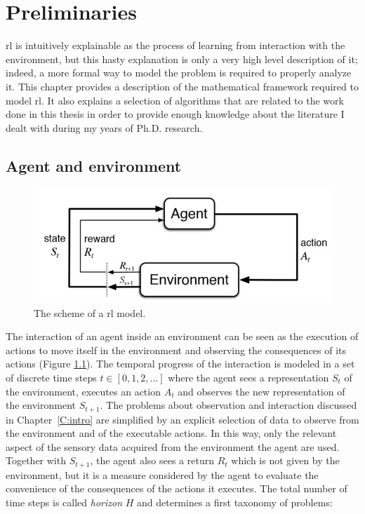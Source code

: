 \chapter{Preliminaries}
\gls{rl} is intuitively explainable as the process of learning from interaction with the environment, but this hasty explanation is only a very high level description of it; indeed, a more formal way to model the problem is required to properly analyze it. This chapter provides a description of the mathematical framework required to model \gls{rl}. It also explains a selection of algorithms that are related to the work done in this thesis in order to provide enough knowledge about the literature I dealt with during my years of Ph.D. research.

\section{Agent and environment}
\begin{figure}[b]
\begin{minipage}{\textwidth}
\begin{center}
  \includegraphics[scale=.75]{img/mdp1.jpg}
\end{center}
\end{minipage}
\caption[Reinforcement Learning problem scheme]{The scheme of a \gls{rl} model.}\label{F:mdp1}
\end{figure}
The interaction of an agent inside an environment can be seen as the execution of actions to move itself in the environment and observing the consequences of its actions (Figure \ref{F:mdp1}). The temporal progress of the interaction is modeled in a set of discrete time steps $t \in [0, 1, 2, \dots]$ where the agent sees a representation $S_t$ of the environment, executes an action $A_t$ and observes the new representation of the environment $S_{t+1}$. The problems about observation and interaction discussed in Chapter~\ref{C:intro} are simplified by an explicit selection of data to observe from the environment and of the executable actions. In this way, only the relevant aspect of the sensory data acquired from the environment the agent are used. Together with $S_{t+1}$, the agent also sees a return $R_t$ which is not given by the environment, but it is a measure considered by the agent to evaluate the convenience of the consequences of the actions it executes. The total number of time steps is called \textit{horizon} $H$ and determines a first taxonomy of problems:
